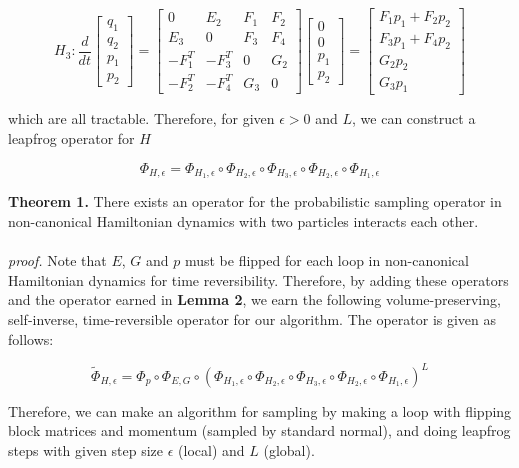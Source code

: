 \documentclass{article}
\begin{document}
\[
H_3 : \frac{d}{dt}
\left[
\begin{array}{ccc}
q_1 \\
q_2 \\
p_1 \\
p_2 
\end{array}
\right]
=
\left[
\begin{array}{cclcc}
0 & E_{2} & F_{1} & F_{2} \\
E_3 & 0& F_3 & F_4 \\
-F_1^T & -F_3^T & 0 & G_2 \\
-F_2^T & -F_4^T & G_3 & 0 
\end{array}
\right]
\left[
\begin{array}{ccc}
0\\
0  \\
p_1 \\
p_2
\end{array}
\right]
=
\left[
\begin{array}{ccc}
F_1 p_1 + F_2 p_2  \\
F_3 p_1 + F_4 p_2  \\
G_2 p_2 \\
G_3 p_1 
\end{array}
\right]
\] 

which are all tractable. Therefore, for given $\epsilon > 0$ and $L$, we can construct a leapfrog operator for $H$

$$\displaystyle\Phi_{H,\epsilon} = \Phi_{H_1,\epsilon} \circ \Phi_{H_2,\epsilon} \circ \Phi_{H_3,\epsilon} \circ \Phi_{H_2,\epsilon} \circ \Phi_{H_1,\epsilon}$$


\noindent \textbf{Theorem 1.} There exists an operator for the probabilistic sampling operator in non-canonical Hamiltonian dynamics with two particles interacts each other.   
\\
\\
\textit{proof.} Note that $E$, $G$ and $p$ must be flipped for each loop in non-canonical Hamiltonian dynamics for time reversibility. Therefore, by adding these operators and the operator earned in \textbf{Lemma 2}, we earn the following volume-preserving, self-inverse, time-reversible operator for our algorithm. The operator is given as follows:

$$\displaystyle\tilde{\Phi}_{H,\epsilon} = \Phi_{p} \circ \Phi_{E,G} \circ (\Phi_{H_1,\epsilon} \circ \Phi_{H_2,\epsilon} \circ \Phi_{H_3,\epsilon} \circ \Phi_{H_2,\epsilon} \circ \Phi_{H_1,\epsilon})^L$$

Therefore, we can make an algorithm for sampling by making a loop with flipping block matrices and momentum (sampled by standard normal), and doing leapfrog steps with given step size $\epsilon$ (local) and $L$ (global).
\end{document}
